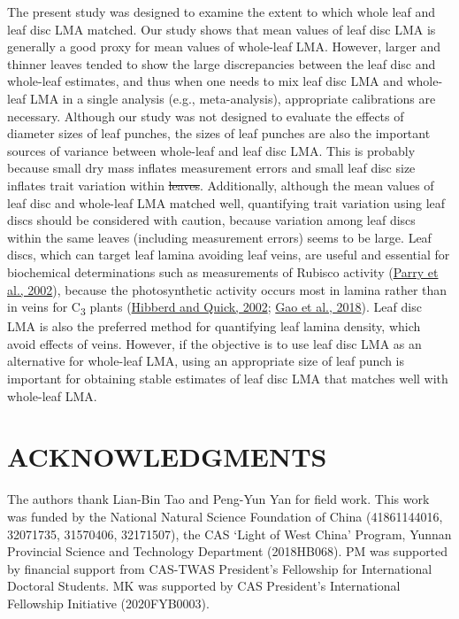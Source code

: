 \documentclass[
  12pt,
  a4paper,
,tablecaptionabove
]{scrartcl}
\providecommand{\DIFaddtex}[1]{{\protect\color{blue}\uwave{#1}}} %
\providecommand{\DIFdeltex}[1]{{\protect\color{red}\sout{#1}}}                      %
\providecommand{\DIFaddbegin}{} %
\providecommand{\DIFaddend}{} %
\providecommand{\DIFdelbegin}{} %
\providecommand{\DIFdelend}{} %
\providecommand{\DIFadd}[1]{\texorpdfstring{\DIFaddtex{#1}}{#1}} %
\providecommand{\DIFdel}[1]{\texorpdfstring{\DIFdeltex{#1}}{}} %
\newcommand{\DIFscaledelfig}{0.5}
\newlength{\DIFdelgraphicswidth} %
\newlength{\DIFdelgraphicsheight} %
\newcommand{\DIFaddincludegraphics}[2][]{{\color{blue}\fbox{\DIFOincludegraphics[#1]{#2}}}} %
\newcommand{\DIFdelincludegraphics}[2][]{%
\sbox{\DIFdelgraphicsbox}{\DIFOincludegraphics[#1]{#2}}%
\settoboxwidth{\DIFdelgraphicswidth}{\DIFdelgraphicsbox} %
\settoboxtotalheight{\DIFdelgraphicsheight}{\DIFdelgraphicsbox} %
\scalebox{\DIFscaledelfig}{%
\parbox[b]{\DIFdelgraphicswidth}{\usebox{\DIFdelgraphicsbox}\\[-\baselineskip] \rule{\DIFdelgraphicswidth}{0em}}\llap{\resizebox{\DIFdelgraphicswidth}{\DIFdelgraphicsheight}{%
\setlength{\unitlength}{\DIFdelgraphicswidth}%
\begin{picture}(1,1)%
\thicklines\linethickness{2pt} %
{\color[rgb]{1,0,0}\put(0,0){\framebox(1,1){}}}%
{\color[rgb]{1,0,0}\put(0,0){\line( 1,1){1}}}%
{\color[rgb]{1,0,0}\put(0,1){\line(1,-1){1}}}%
\end{picture}%
}\hspace*{3pt}}} %
} %
\DeclareRobustCommand{\DIFaddbegin}{\DIFOaddbegin \let\includegraphics\DIFaddincludegraphics} %
\DeclareRobustCommand{\DIFaddend}{\DIFOaddend \let\includegraphics\DIFOincludegraphics} %
\DeclareRobustCommand{\DIFdelbegin}{\DIFOdelbegin \let\includegraphics\DIFdelincludegraphics} %
\DeclareRobustCommand{\DIFdelend}{\DIFOaddend \let\includegraphics\DIFOincludegraphics} %
\begin{document}
The present study was designed to examine the extent to which whole leaf and leaf disc LMA matched.
Our study shows that mean values of leaf disc LMA is generally a good proxy for mean values of whole-leaf LMA.
However, larger and thinner leaves tended to show the large discrepancies between the leaf disc and whole-leaf estimates, and thus when one needs to mix leaf disc LMA and whole-leaf LMA in a single analysis (e.g., meta-analysis), appropriate calibrations are necessary.
Although our study was not designed to evaluate the effects of diameter sizes of leaf punches, the sizes of leaf punches are also the important sources of variance between whole-leaf and leaf disc LMA.
This is probably because small dry mass inflates measurement errors and small leaf disc size inflates trait variation within \DIFdelbegin \DIFdel{leaves}\DIFdelend \DIFaddbegin \DIFadd{leave}\DIFaddend .
Additionally, although the mean values of leaf disc and whole-leaf LMA matched well, quantifying trait variation using leaf discs should be considered with caution, because variation among leaf discs within the same leaves (including measurement errors) seems to be large.
Leaf discs, which can target leaf lamina avoiding leaf veins, are useful and essential for biochemical determinations such as measurements of Rubisco activity (\protect\hyperlink{ref-Parry2002}{Parry et al., 2002}), because the photosynthetic activity occurs most in lamina rather than in veins for C\textsubscript{3} plants (\protect\hyperlink{ref-Hibberd2002}{Hibberd and Quick, 2002}; \protect\hyperlink{ref-Gao2018}{Gao et al., 2018}).
Leaf disc LMA is also the preferred method for quantifying leaf lamina density, which avoid effects of veins.
However, if the objective is to use leaf disc LMA as an alternative for whole-leaf LMA, using an appropriate size of leaf punch is important for obtaining stable estimates of leaf disc LMA that matches well with whole-leaf LMA.

\hypertarget{acknowledgments}{%
\section{ACKNOWLEDGMENTS}\label{acknowledgments}}

The authors thank Lian-Bin Tao and Peng-Yun Yan for field work.
This work was funded by the National Natural Science Foundation of China (41861144016, 32071735, 31570406, 32171507), the CAS `Light of West China' Program, Yunnan Provincial Science and Technology Department (2018HB068).
PM was supported by financial support from CAS-TWAS President's Fellowship for International Doctoral Students.
MK was supported by CAS President's International Fellowship Initiative (2020FYB0003).
\end{document}
